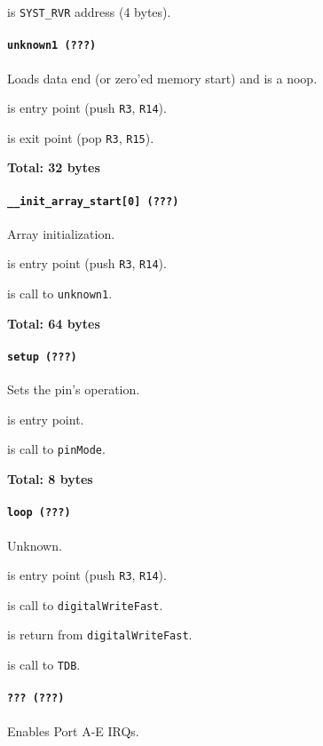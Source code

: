  is \texttt{SYST\_RVR} address (4 bytes).

\paragraph{\texttt{unknown1 (???)}} Loads data end (or zero'ed memory start) and
is a noop.

 is entry point (push \texttt{R3}, \texttt{R14}).

 is exit point (pop \texttt{R3}, \texttt{R15}).

\textbf{Total: 32 bytes}

\paragraph{\texttt{\_\_init\_array\_start[0] (???)}} Array initialization.

 is entry point (push \texttt{R3}, \texttt{R14}).

 is call to \texttt{unknown1}.

\textbf{Total: 64 bytes}

\paragraph{\texttt{setup (???)}} Sets the pin's operation.

 is entry point.

 is call to \texttt{pinMode}.

\textbf{Total: 8 bytes}

\paragraph{\texttt{loop (???)}} Unknown.

 is entry point (push \texttt{R3}, \texttt{R14}).

 is call to \texttt{digitalWriteFast}.

 is return from \texttt{digitalWriteFast}.

 is call to \texttt{TDB}.

\paragraph{\texttt{??? (???)}} Enables Port A-E IRQs.

